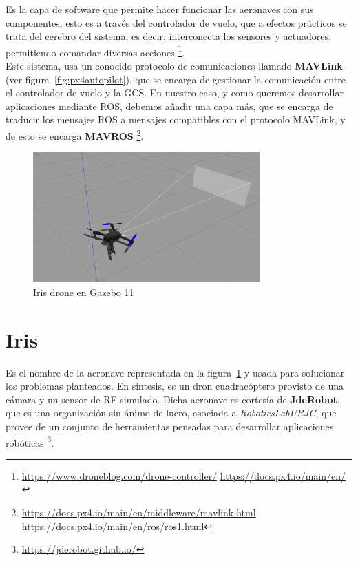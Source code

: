 Es la capa de software que permite hacer funcionar las aeronaves con sus componentes, esto es a través del controlador de vuelo, que a efectos prácticos se trata del cerebro del sistema, es decir, interconecta los sensores y actuadores, permitiendo comandar diversas acciones \footnote[14]{\url{https://www.droneblog.com/drone-controller/} \url{https://docs.px4.io/main/en/}}.\\

Este sistema, usa un conocido protocolo de comunicaciones llamado \textbf{MAVLink} (ver figura~\ref{fig:px4autopilot}), que se encarga de gestionar la comunicación entre el controlador de vuelo y la \ac{GCS}. En nuestro caso, y como queremos desarrollar aplicaciones mediante \ac{ROS}, debemos añadir una capa más, que se encarga de traducir los mensajes ROS a mensajes compatibles con el protocolo MAVLink, y de esto se encarga \textbf{MAVROS} \footnote[15]{\url{https://docs.px4.io/main/en/middleware/mavlink.html} \url{https://docs.px4.io/main/en/ros/ros1.html}}.\\

\begin{figure} [tp]
	\begin{center}
	\includegraphics[height=5cm]{imagenes/cap3/8_iris_drone.png}
	\end{center}
	\caption[Iris drone en Gazebo 11]{Iris drone en Gazebo 11}
	\label{fig:irisdrone}
\end{figure}

\section{Iris}
\label{sec:iris}

Es el nombre de la aeronave representada en la figura~\ref{fig:irisdrone} y usada para solucionar los problemas planteados. En síntesis, es un dron cuadracóptero provisto de una cámara y un sensor de \ac{RF} simulado. Dicha aeronave es cortesía de \textbf{JdeRobot}, que es una organización sin ánimo de lucro, asociada a \emph{RoboticsLabURJC}, que provee de un conjunto de herramientas pensadas para desarrollar aplicaciones robóticas \footnote[16]{\url{https://jderobot.github.io/}}.\\